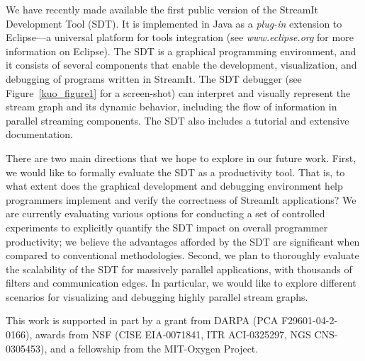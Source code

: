 \documentclass{csailabstractbook}
\begin{document}

We  have recently  made  available  the first  public  version of  the
StreamIt Development Tool (SDT).  It  is implemented in Java as a {\it
plug-in}  extension  to   Eclipse---a  universal  platform  for  tools
integration  (see {\it www.eclipse.org}  for more  information on Eclipse).
The SDT  is a  graphical programming environment,  and it  consists of
several  components that  enable the  development,  visualization, and
debugging  of programs  written in  StreamIt.  The  SDT  debugger (see
Figure~\ref{kuo_figure1} for a  screen-shot) can interpret and visually
represent  the stream graph  and its  dynamic behavior,  including the
flow of  information in parallel  streaming components.  The  SDT also
includes a tutorial and extensive documentation.


There are  two main directions that  we hope to explore  in our future
work.  First,  we  would  like  to  formally evaluate  the  SDT  as  a
productivity  tool.   That  is,  to  what extent  does  the  graphical
development and  debugging environment help  programmers implement and
verify  the correctness  of StreamIt  applications?  We  are currently
evaluating  various  options  for   conducting  a  set  of  controlled
experiments  to   explicitly  quantify  the  SDT   impact  on  overall
programmer productivity; we believe the advantages afforded by the SDT
are significant when compared to conventional methodologies.
Second, we plan to thoroughly  evaluate the scalability of the SDT for
massively  parallel  applications,   with  thousands  of  filters  and
communication  edges.   In  particular,   we  would  like  to  explore
different  scenarios  for visualizing  and  debugging highly  parallel
stream graphs.


This work is supported in part by a grant from DARPA (PCA
F29601-04-2-0166), awards from NSF (CISE EIA-0071841, ITR ACI-0325297,
NGS CNS-0305453), and a fellowship from the MIT-Oxygen Project.


\end{document}
